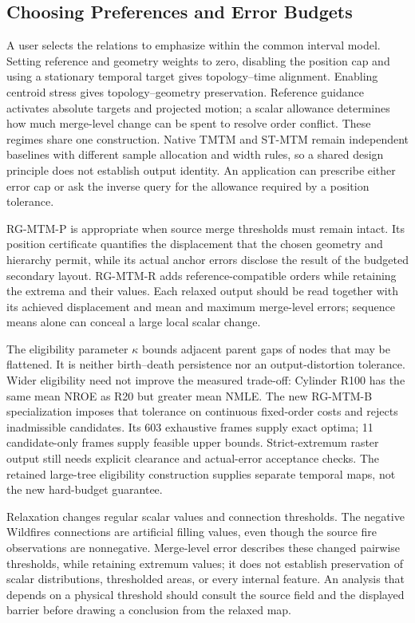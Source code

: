 \subsection{Choosing Preferences and Error Budgets}
A user selects the relations to emphasize within the common interval model. Setting reference and geometry weights to zero, disabling the position cap and using a stationary temporal target gives topology--time alignment. Enabling centroid stress gives topology--geometry preservation. Reference guidance activates absolute targets and projected motion; a scalar allowance determines how much merge-level change can be spent to resolve order conflict. These regimes share one construction. Native TMTM and ST-MTM remain independent baselines with different sample allocation and width rules, so a shared design principle does not establish output identity. An application can prescribe either error cap or ask the inverse query for the allowance required by a position tolerance.

RG-MTM-P is appropriate when source merge thresholds must remain intact. Its position certificate quantifies the displacement that the chosen geometry and hierarchy permit, while its actual anchor errors disclose the result of the budgeted secondary layout. RG-MTM-R adds reference-compatible orders while retaining the extrema and their values. Each relaxed output should be read together with its achieved displacement and mean and maximum merge-level errors; sequence means alone can conceal a large local scalar change.

The eligibility parameter $\kappa$ bounds adjacent parent gaps of nodes that may be flattened. It is neither birth--death persistence nor an output-distortion tolerance. Wider eligibility need not improve the measured trade-off: Cylinder R100 has the same mean NROE as R20 but greater mean NMLE. The new RG-MTM-B specialization imposes that tolerance on continuous fixed-order costs and rejects inadmissible candidates. Its 603 exhaustive frames supply exact optima; 11 candidate-only frames supply feasible upper bounds. Strict-extremum raster output still needs explicit clearance and actual-error acceptance checks. The retained large-tree eligibility construction supplies separate temporal maps, not the new hard-budget guarantee.

Relaxation changes regular scalar values and connection thresholds. The negative Wildfires connections are artificial filling values, even though the source fire observations are nonnegative. Merge-level error describes these changed pairwise thresholds, while retaining extremum values; it does not establish preservation of scalar distributions, thresholded areas, or every internal feature. An analysis that depends on a physical threshold should consult the source field and the displayed barrier before drawing a conclusion from the relaxed map.

